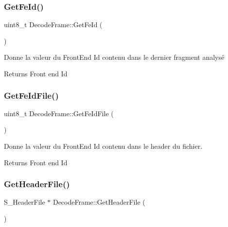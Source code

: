 \subsubsection{\texorpdfstring{Get\+Fe\+Id()}{GetFeId()}}
{\footnotesize\ttfamily uint8\+\_\+t Decode\+Frame\+::\+Get\+Fe\+Id (\begin{DoxyParamCaption}{ }\end{DoxyParamCaption})\hspace{0.3cm}{\ttfamily [inline]}}



Donne la valeur du Front\+End Id contenu dans le dernier fragment analysé 

\begin{DoxyReturn}{Returns}
Front end Id 
\end{DoxyReturn}
\mbox{\label{classDecodeFrame_a0e408e31eabbebea698d4f3122b79427}} 
\subsubsection{\texorpdfstring{Get\+Fe\+Id\+File()}{GetFeIdFile()}}
{\footnotesize\ttfamily uint8\+\_\+t Decode\+Frame\+::\+Get\+Fe\+Id\+File (\begin{DoxyParamCaption}{ }\end{DoxyParamCaption})\hspace{0.3cm}{\ttfamily [inline]}}



Donne la valeur du Front\+End Id contenu dans le header du fichier. 

\begin{DoxyReturn}{Returns}
Front end Id 
\end{DoxyReturn}
\mbox{\label{classDecodeFrame_ad8de43342e31a5e31c2a8c57c576546f}} 
\subsubsection{\texorpdfstring{Get\+Header\+File()}{GetHeaderFile()}}
{\footnotesize\ttfamily S\+\_\+\+Header\+File $\ast$ Decode\+Frame\+::\+Get\+Header\+File (\begin{DoxyParamCaption}{ }\end{DoxyParamCaption})}



